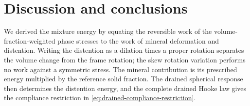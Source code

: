 \documentclass[11pt]{article}
\begin{document}





\section{Discussion and conclusions}
\label{sec:conclusion}

We derived the mixture energy by equating the reversible work of the
volume-fraction-weighted phase stresses to the work of mineral deformation
and distention. Writing the distention as a dilation times a proper rotation separates the
volume change from the frame rotation; the skew rotation variation performs no
work against a symmetric stress.
The mineral contribution is its prescribed energy multiplied by the
reference solid fraction. The drained spherical response then determines
the distention energy, and the complete drained Hooke law gives the
compliance restriction in \eqref{eq:drained-compliance-restriction}.
\end{document}

